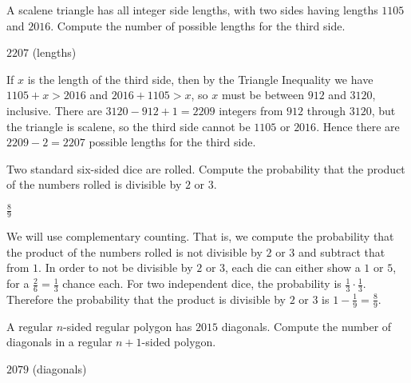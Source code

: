 \documentclass[11pt]{article}
\begin{document}
\begin{problem}
A scalene triangle has all integer side lengths, with two sides having lengths $1105$ and $2016$. Compute the number of possible lengths for the third side.
\end{problem}

\begin{answer}
$\boxed{2207}$ (lengths)
\end{answer}

\begin{solution}
If $x$ is the length of the third side, then by the Triangle Inequality we have $1105 + x > 2016$ and $2016 + 1105 > x$, so $x$ must be between $912$ and $3120$, inclusive. There are $3120 - 912 + 1 = 2209$ integers from $912$ through $3120$, but the triangle is scalene, so the third side cannot be $1105$ or $2016$. Hence there are $2209 - 2 = \boxed{2207}$ possible lengths for the third side.
\end{solution}


\begin{problem}
Two standard six-sided dice are rolled. Compute the probability that the product of the numbers rolled is divisible by $2$ or $3$.
\end{problem}

\begin{answer} %
$\boxed{\frac{8}{9}}$
\end{answer}

\begin{solution}
We will use complementary counting. That is, we compute the probability that the product of the numbers rolled is not divisible by $2$ or $3$ and subtract that from $1$. In order to not be divisible by $2$ or $3$, each die can either show a $1$ or $5$, for a $\frac{2}{6} = \frac{1}{3}$ chance each. For two independent dice, the probability is $\frac{1}{3} \cdot \frac{1}{3}$. Therefore the probability that the product is divisible by $2$ or $3$ is $1 - \frac{1}{9} = \boxed{\frac{8}{9}}$.
\end{solution}


\begin{problem}
A regular $n$-sided regular polygon has $2015$ diagonals. Compute the number of diagonals in a regular $n+1$-sided polygon.
\end{problem}

\begin{answer}
$\boxed{2079}$ (diagonals)
\end{answer}
\end{document}
